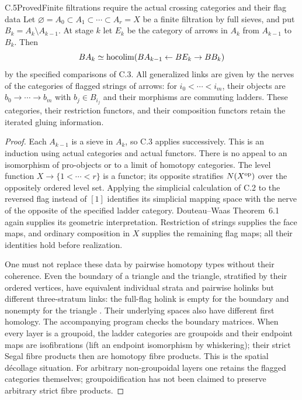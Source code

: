 \begin{statement}{C.5}{Proved}{Finite filtrations require the actual crossing categories and their flag data}
Let $\varnothing=A_0\subset A_1\subset\cdots\subset A_r=X$ be a finite filtration by full sieves, and put $B_k=A_k\setminus A_{k-1}$. At stage $k$ let $E_k$ be the category of arrows in $A_k$ from $A_{k-1}$ to $B_k$. Then
\[
 BA_k\simeq\operatorname*{hocolim}(BA_{k-1}\leftarrow BE_k\to BB_k)
\]
by the specified comparisons of C.3. All generalized links are given by the nerves of the categories of flagged strings of arrows: for $i_0<\cdots<i_m$, their objects are $b_0\to\cdots\to b_m$ with $b_j\in B_{i_j}$ and their morphisms are commuting ladders. These categories, their restriction functors, and their composition functors retain the iterated gluing information.
\end{statement}
\begin{proof}
Each $A_{k-1}$ is a sieve in $A_k$, so C.3 applies successively. This is an induction using actual categories and actual functors. There is no appeal to an isomorphism of pro-objects or to a limit of homotopy categories. The level function $X\to\{1<\cdots<r\}$ is a functor; its opposite stratifies $N(X^{\mathrm{op}})$ over the oppositely ordered level set. Applying the simplicial calculation of C.2 to the reversed flag instead of $[1]$ identifies its simplicial mapping space with the nerve of the opposite of the specified ladder category. Douteau--Waas Theorem~6.1 again supplies its geometric interpretation. Restriction of strings supplies the face maps, and ordinary composition in $X$ supplies the remaining flag maps; all their identities hold before realization.

One must not replace these data by pairwise homotopy types without their coherence. Even the boundary of a triangle and the triangle, stratified by their ordered vertices, have equivalent individual strata and pairwise holinks but different three-stratum links: the full-flag holink is empty for the boundary and nonempty for the triangle \citep[Example~2.30]{CDDouteauWaas2022}. Their underlying spaces also have different first homology. The accompanying program checks the boundary matrices. When every layer is a groupoid, the ladder categories are groupoids and their endpoint maps are isofibrations (lift an endpoint isomorphism by whiskering); their strict Segal fibre products then are homotopy fibre products. This is the spatial d\'ecollage situation. For arbitrary non-groupoidal layers one retains the flagged categories themselves; groupoidification has not been claimed to preserve arbitrary strict fibre products.
\end{proof}

